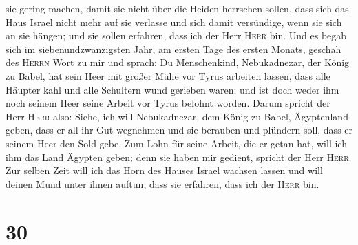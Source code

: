 sie gering machen, damit sie nicht über die Heiden herrschen sollen,
 dass sich das Haus Israel nicht mehr auf sie verlasse
und sich damit versündige, wenn sie sich an sie hängen; und sie sollen
erfahren, dass ich der Herr \textsc{Herr} bin.  Und es
begab sich im siebenundzwanzigsten Jahr, am ersten Tage des ersten
Monats, geschah des \textsc{Herrn} Wort zu mir und sprach:
 Du Menschenkind, Nebukadnezar, der König zu Babel, hat
sein Heer mit großer Mühe vor Tyrus arbeiten lassen, dass alle Häupter
kahl und alle Schultern wund gerieben waren; und ist doch weder ihm noch
seinem Heer seine Arbeit vor Tyrus belohnt worden.  Darum
spricht der Herr \textsc{Herr} also: Siehe, ich will Nebukadnezar, dem
König zu Babel, Ägyptenland geben, dass er all ihr Gut wegnehmen und sie
berauben und plündern soll, dass er seinem Heer den Sold gebe.
 Zum Lohn für seine Arbeit, die er getan hat, will ich
ihm das Land Ägypten geben; denn sie haben mir gedient, spricht der Herr
\textsc{Herr}.  Zur selben Zeit will ich das Horn des
Hauses Israel wachsen lassen und will deinen Mund unter ihnen auftun,
dass sie erfahren, dass ich der \textsc{Herr} bin.

\hypertarget{section-29}{%
\section{30}\label{section-29}}

